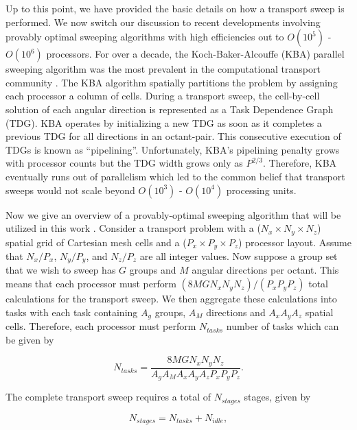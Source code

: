 Up to this point, we have provided the basic details on how a transport sweep is performed. We now switch our discussion to recent developments involving provably optimal sweeping algorithms with high efficiencies out to $O(10^5)$ - $O(10^6)$ processors. For over a decade, the Koch-Baker-Alcouffe (KBA) parallel sweeping algorithm was the most prevalent in the computational transport community \cite{ref::KBA,baker1998s}. The KBA algorithm spatially partitions the problem by assigning each processor a column of cells. During a transport sweep, the cell-by-cell solution of each angular direction is represented as a Task Dependence Graph (TDG). KBA operates by initializing a new TDG as soon as it completes a previous TDG for all directions in an octant-pair. This consecutive execution of TDGs is known as ``pipelining''. Unfortunately, KBA's pipelining penalty grows with processor counts but the TDG width grows only as $P^{2/3}$. Therefore, KBA eventually runs out of parallelism which led to the common belief that transport sweeps would not scale beyond $O(10^3)$ - $O(10^4)$ processing units.

Now we give an overview of a provably-optimal sweeping algorithm that will be utilized in this work \cite{ref::eff_sweeps,adams2013provably}. Consider a transport problem with a ($N_x \times N_y \times N_z $) spatial grid of Cartesian mesh cells and a ($P_x \times P_y \times P_z $) processor layout. Assume that $N_x/P_x$, $N_y/P_y$, and $N_z/P_z$ are all integer values. Now suppose a group set that we wish to sweep has $G$ groups and $M$ angular directions per octant. This means that each processor must perform $(8 M G N_x N_y N_z)/(P_x P_y P_z)$ total calculations for the transport sweep. We then aggregate these calculations into tasks with each task containing $A_g$ groups, $A_M$ directions and $A_x A_y A_z$ spatial cells. Therefore, each processor must perform $N_{tasks}$ number of tasks which can be given by

\begin{equation}
\label{sec::Sn_Solution_Spatial_Ntasks}
N_{tasks} = \frac{8 M G N_x N_y N_z}{A_g A_M A_x A_y A_z  P_x P_y P_z} .
\end{equation}

\noindent The complete transport sweep requires a total of $N_{stages}$ stages, given by

\begin{equation}
\label{sec::Sn_Solution_Spatial_Nstages}
N_{stages} = N_{tasks} + N_{idle} ,
\end{equation}

